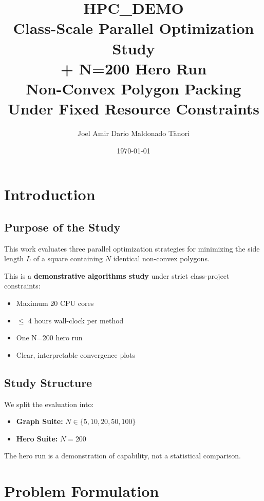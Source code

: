 \documentclass[11pt]{report}
\title{
\textbf{HPC\_DEMO}\\
Class-Scale Parallel Optimization Study\\
+ N=200 Hero Run\\[0.5em]
\large Non-Convex Polygon Packing Under Fixed Resource Constraints
}
\author{Joel Amir Dario Maldonado Tänori}
\date{\today}
\begin{document}
\maketitle
\tableofcontents
\clearpage

\chapter{Introduction}

\section{Purpose of the Study}

This work evaluates three parallel optimization strategies for minimizing
the side length $L$ of a square containing $N$ identical non-convex polygons.

This is a \textbf{demonstrative algorithms study} under strict class-project
constraints:

\begin{itemize}
    \item Maximum 20 CPU cores
    \item $\le$ 4 hours wall-clock per method
    \item One N=200 hero run
    \item Clear, interpretable convergence plots
\end{itemize}

\section{Study Structure}

We split the evaluation into:

\begin{itemize}
    \item \textbf{Graph Suite:} $N \in \{5,10,20,50,100\}$
    \item \textbf{Hero Suite:} $N = 200$
\end{itemize}

The hero run is a demonstration of capability, not a statistical comparison.

\chapter{Problem Formulation}
\end{document}
